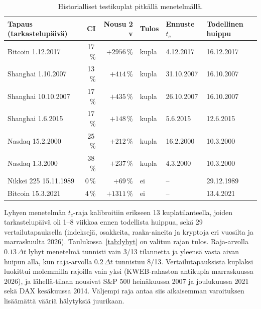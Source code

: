\documentclass[10pt,a4paper]{article}
\newcommand{\tc}{t_c}
\begin{document}
\begin{table}[htbp]
  \centering\footnotesize
  \begin{tabular}{@{}l r r l l l@{}}
    \toprule
    Tapaus (tarkastelupäivä) & CI & Nousu 2 v & Tulos & Ennuste $\tc$ & Todellinen huippu \\
    \midrule
    Bitcoin 1.12.2017      & 17\,\% & $+2956\,\%$ & kupla & 4.12.2017  & 16.12.2017 \\
    Shanghai 1.10.2007     & 13\,\% & $+414\,\%$  & kupla & 31.10.2007 & 16.10.2007 \\
    Shanghai 10.10.2007    & 17\,\% & $+435\,\%$  & kupla & 26.10.2007 & 16.10.2007 \\
    Shanghai 1.6.2015      & 17\,\% & $+148\,\%$  & kupla & 5.6.2015   & 12.6.2015 \\
    Nasdaq 15.2.2000       & 25\,\% & $+212\,\%$  & kupla & 16.2.2000  & 10.3.2000 \\
    Nasdaq 1.3.2000        & 38\,\% & $+237\,\%$  & kupla & 4.3.2000   & 10.3.2000 \\
    Nikkei 225 15.11.1989  & 0\,\%  & $+69\,\%$   & ei    & --         & 29.12.1989 \\
    Bitcoin 15.3.2021      & 4\,\%  & $+1311\,\%$ & ei    & --         & 13.4.2021 \\
    \bottomrule
  \end{tabular}
  \caption{Historialliset testikuplat pitkällä menetelmällä.}
  \label{tab:testit}
\end{table}

Lyhyen menetelmän $\tc$-raja kalibroitiin erikseen 13 kuplatilanteella, joiden tarkastelupäivä oli
1--8 viikkoa ennen todellista huippua, sekä 29 vertailutapauksella (indeksejä, osakkeita, raaka-aineita
ja kryptoja eri vuosilta ja marraskuulta 2026). Taulukossa~\ref{tab:lyhyt} on valitun rajan tulos.
Raja-arvolla $0.13\,\Delta t$ lyhyt menetelmä tunnisti vain 3/13 tilannetta ja yleensä vasta aivan
huipun alla, kun raja-arvolla $0.2\,\Delta t$ tunnistuu 8/13. Vertailutapauksista kuplaksi
luokittui molemmilla rajoilla vain yksi (KWEB-rahaston antikupla marraskuussa 2026), ja
lähellä-tilaan nousivat S\&P 500 heinäkuussa 2007 ja joulukuussa 2021 sekä DAX kesäkuussa 2014.
Väljempi raja antaa siis aikaisemman varoituksen lisäämättä vääriä hälytyksiä juurikaan.
\end{document}

